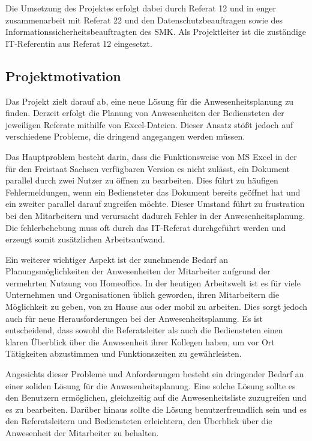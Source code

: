 Die Umsetzung des Projektes erfolgt dabei durch Referat 12 und in enger zusammenarbeit mit Referat 22 und den Datenschutzbeauftragen sowie des Informationssicherheitsbeauftragten des SMK. Als Projektleiter ist die zuständige IT-Referentin aus Referat 12 eingesetzt.

\subsection{Projektmotivation}
\label{sec:Projektmotivation}
Das Projekt zielt darauf ab, eine neue Lösung für die Anwesenheitsplanung zu finden. Derzeit erfolgt die Planung von Anwesenheiten der Bediensteten der jeweiligen Referate mithilfe von Excel-Dateien. Dieser Ansatz stößt jedoch auf verschiedene Probleme, die dringend angegangen werden müssen.

Das Hauptproblem besteht darin, dass die Funktionsweise von MS Excel in der für den Freistaat Sachsen verfügbaren Version es nicht zulässt, ein Dokument parallel durch zwei Nutzer zu öffnen \bzw zu bearbeiten. Dies führt zu häufigen Fehlermeldungen, wenn ein Bediensteter das Dokument bereits geöffnet hat und ein zweiter parallel darauf zugreifen möchte. Dieser Umstand führt zu frustration bei den Mitarbeitern und verursacht dadurch Fehler in der Anwesenheitsplanung. Die fehlerbehebung muss oft durch das IT-Referat durchgeführt werden und erzeugt somit zusätzlichen Arbeitsaufwand.

Ein weiterer wichtiger Aspekt ist der zunehmende Bedarf an Planungsmöglichkeiten der Anwesenheiten der Mitarbeiter aufgrund der vermehrten Nutzung von Homeoffice. In der heutigen Arbeitswelt ist es für viele Unternehmen und Organisationen üblich geworden, ihren Mitarbeitern die Möglichkeit zu geben, von zu Hause aus oder mobil zu arbeiten. Dies sorgt jedoch auch für neue Herausforderungen bei der Anwesenheitsplanung. Es ist entscheidend, dass sowohl die Referatsleiter als auch die Bediensteten einen klaren Überblick über die Anwesenheit ihrer Kollegen haben, um vor Ort Tätigkeiten abzustimmen und \zB Funktionszeiten zu gewährleisten.

Angesichts dieser Probleme und Anforderungen besteht ein dringender Bedarf an einer soliden Lösung für die Anwesenheitsplanung. Eine solche Lösung sollte es den Benutzern ermöglichen, gleichzeitig auf die Anwesenheitsliste zuzugreifen und es zu bearbeiten. Darüber hinaus sollte die Lösung benutzerfreundlich sein und es den Referatsleitern und Bediensteten erleichtern, den Überblick über die Anwesenheit der Mitarbeiter zu behalten.


